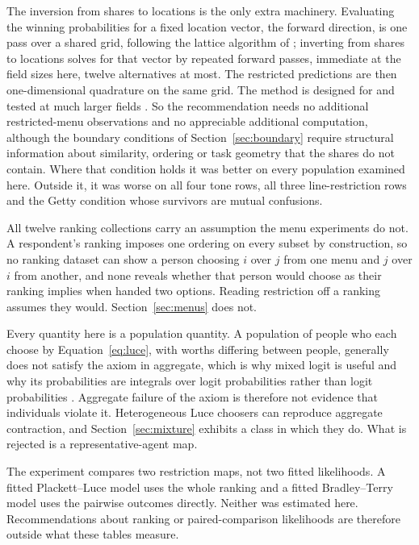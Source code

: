 \documentclass[11pt]{article}
\begin{document}
The inversion from shares to locations is the only extra machinery. Evaluating the winning
probabilities for a fixed location vector, the forward direction, is one pass over a shared grid,
following the lattice algorithm of \cite{cotton2021}; inverting from shares to locations solves
for that vector by repeated forward passes, immediate at the field sizes here, twelve
alternatives at most. The restricted predictions are then one-dimensional quadrature on the same
grid. The method is designed for and tested at much larger fields \cite{cotton2021}. So the
recommendation needs no additional restricted-menu observations and no appreciable additional
computation, although the boundary conditions of Section~\ref{sec:boundary} require structural
information about similarity, ordering or task geometry that the shares do not contain. Where that
condition holds it was better on every population
examined here. Outside it, it was worse on all four tone rows, all three line-restriction rows
and the Getty condition whose survivors are mutual confusions.

All twelve ranking collections carry an assumption the menu experiments do not.
A respondent's ranking imposes one ordering on every subset by construction, so no
ranking dataset can show a person choosing $i$ over $j$ from one menu and $j$ over $i$
from another, and none reveals whether that person would choose as their ranking implies
when handed two options. Reading restriction off a ranking assumes they would.
Section~\ref{sec:menus} does not.

Every quantity here is a population quantity. A population of people who each choose by
Equation~\eqref{eq:luce}, with worths differing between people, generally does not
satisfy the axiom in aggregate, which is why mixed logit is useful and why its
probabilities are integrals over logit probabilities rather than logit probabilities
\cite{mcfaddentrain2000}. Aggregate failure of the axiom is therefore not evidence that
individuals violate it. Heterogeneous Luce choosers can reproduce aggregate contraction, and
Section~\ref{sec:mixture} exhibits a class in which they do. What
is rejected is a representative-agent map.

The experiment compares two restriction maps, not two fitted likelihoods. A fitted
Plackett--Luce model \cite{plackett1975} uses the whole ranking and a fitted Bradley--Terry
model \cite{bradley1952} uses the pairwise outcomes directly. Neither was estimated here. Recommendations about ranking or
paired-comparison likelihoods are therefore outside what these tables measure.
\end{document}
